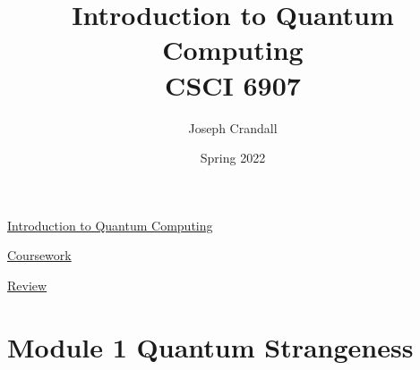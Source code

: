 
\usepackage{algorithm, algpseudocode, color, gensymb, siunitx, soul, subfiles}
\usepackage[a4paper, total={7.5in, 10in}]{geometry}

\title{Introduction to Quantum Computing\\
\large CSCI 6907}
\author{Joseph Crandall}
\date{Spring 2022}


\maketitle

\href{https://www2.seas.gwu.edu/~simhaweb/quantum/index.html}{Introduction to Quantum Computing}

\href{https://www2.seas.gwu.edu/~simhaweb/quantum/coursework.html}{Coursework}


\href{https://www2.seas.gwu.edu/~simhaweb/quantum/modules/review/review.html}{Review}

%

%

%

%

%

\section{Module 1 Quantum Strangeness}



